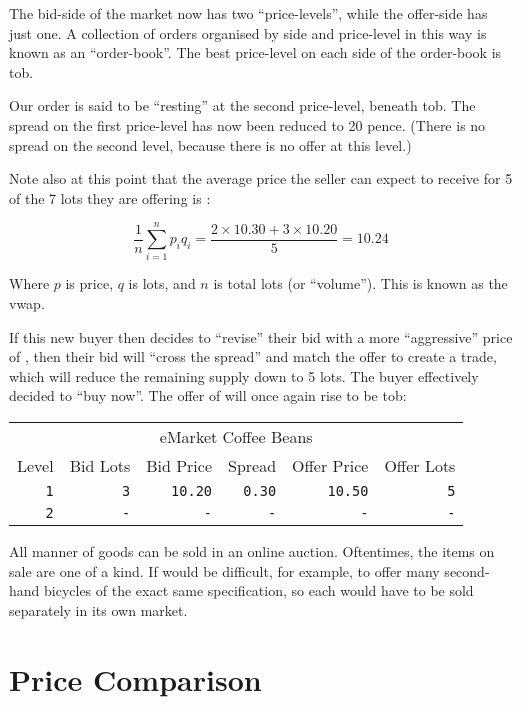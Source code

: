 \documentclass[12pt,a4paper,notitlepage,bibliography=totoc]{scrreprt}
\newcommand{\s}{\textsterling}
\begin{document}
The \gls{bid}-side of the \gls{market} now has two ``\glspl{price-level}'', while the
\gls{offer}-side has just one. A collection of \glspl{order} organised by side and \gls{price-level}
in this way is known as an ``\gls{order-book}''. The best \gls{price-level} on each side of the
\gls{order-book} is \gls{tob}.

Our \gls{order} is said to be ``resting'' at the second \gls{price-level}, beneath \gls{tob}. The
\gls{spread} on the first \gls{price-level} has now been reduced to 20 pence. (There is no
\gls{spread} on the second level, because there is no \gls{offer} at this level.)

Note also at this point that the average price the seller can expect to receive for 5 of the 7
\glspl{lot} they are offering is \s10.24:

\[
\frac{1}{n}\sum_{i=1}^{n}p_iq_i = \frac{2\times10.30+3\times10.20}{5} = 10.24
\]

Where $p$ is price, $q$ is \glspl{lot}, and $n$ is total \glspl{lot} (or ``\gls{volume}''). This is
known as the \gls{vwap}.

If this new buyer then decides to ``revise'' their \gls{bid} with a more ``aggressive'' price of
\s10.50, then their \gls{bid} will ``cross the \gls{spread}'' and match the \gls{offer} to create a
trade, which will reduce the remaining supply down to 5 \glspl{lot}. The buyer effectively decided
to ``buy now''. The \gls{offer} of \s10.20 will once again rise to be \gls{tob}:

\vspace{5mm}
\begin{tabular}{r|rrrrr}
\multicolumn{6}{c}{eMarket Coffee Beans}\\
Level&Bid Lots&Bid Price&Spread&Offer Price&Offer Lots\\
\hline
\texttt{1}&\texttt{3}&\texttt{10.20}&\texttt{0.30}&\texttt{10.50}&\texttt{5}\\
\texttt{2}&\texttt{-}&\texttt{-}&\texttt{-}&\texttt{-}&\texttt{-}\\
\end{tabular}
\vspace{5mm}

All manner of goods can be sold in an online \gls{auction}. Oftentimes, the items on sale are one of
a kind. If would be difficult, for example, to \gls{offer} many second-hand bicycles of the exact
same specification, so each would have to be sold separately in its own \gls{market}.

\section{Price Comparison}
\end{document}
